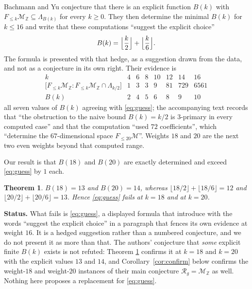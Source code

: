 \documentclass[11pt]{amsart}
\newtheorem{theorem}{Theorem}
\theoremstyle{remark}
\newcommand{\Mm}{\mathcal M}
\newcommand{\MZ}{\mathcal M_{\mathbb Z}}
\newcommand{\Rg}{\mathcal R_g}
\newcommand{\Lam}{\Lambda}
\begin{document}
Bachmann and Yu \cite{BY} conjecture that there is an explicit function $B(k)$ with
$F_{\le k}\MZ\subseteq\Lam_{B(k)}$ for every $k\ge0$. They then determine the minimal $B(k)$ for
$k\le16$ and write that these computations ``suggest the explicit choice''
\begin{equation}\label{eq:guess}
 B(k)=\Bigl\lfloor\frac k2\Bigr\rfloor+\Bigl\lfloor\frac k6\Bigr\rfloor .
\end{equation}
The formula is presented with that hedge, as a suggestion drawn from the data, and not as a
conjecture in its own right. Their evidence is
\[
\begin{array}{c|ccccccc}
 k & 4 & 6 & 8 & 10 & 12 & 14 & 16\\\hline
 \bigl[F_{\le k}\MZ:F_{\le k}\MZ\cap\Lam_{k/2}\bigr] & 1 & 3 & 3 & 9 & 81 & 729 & 6561\\
 B(k) & 2 & 4 & 5 & 6 & 8 & 9 & 10
\end{array}
\]
all seven values of $B(k)$ agreeing with \eqref{eq:guess}; the accompanying text records that
``the obstruction to the naive bound $B(k)=k/2$ is $3$-primary in every computed case'' and that
the computation ``used $72$ coefficients'', which ``determine the $67$-dimensional space
$F_{\le20}\Mm$''. Weights $18$ and $20$ are the next two even weights beyond that computed range.

Our result is that $B(18)$ and $B(20)$ are exactly determined and exceed \eqref{eq:guess} by
$1$ each.

\begin{theorem}\label{thm:main}
$B(18)=13$ and $B(20)=14$, whereas
$\lfloor18/2\rfloor+\lfloor18/6\rfloor=12$ and $\lfloor20/2\rfloor+\lfloor20/6\rfloor=13$.
Hence \eqref{eq:guess} fails at $k=18$ and at $k=20$.
\end{theorem}

\medskip
\noindent\textbf{Status.}
What fails is \eqref{eq:guess}, a displayed formula that \cite{BY} introduce with the words
``suggest the explicit choice'' in a paragraph that fences its own evidence at weight $16$. It is a
hedged suggestion rather than a numbered conjecture, and we do not present it as more than that. The
authors' conjecture that \emph{some} explicit finite $B(k)$ exists is not refuted: Theorem
\ref{thm:main} confirms it at $k=18$ and $k=20$ with the explicit values $13$ and $14$, and
Corollary~\ref{cor:confirm} below confirms the weight-$18$ and weight-$20$ instances of their main
conjecture $\Rg=\MZ$ as well. Nothing here proposes a replacement for \eqref{eq:guess}.
\end{document}
